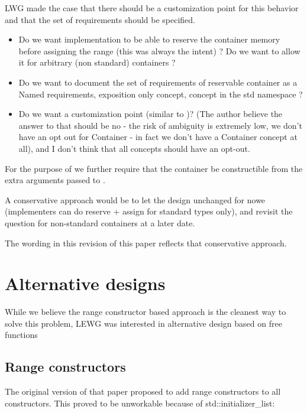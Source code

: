 \documentclass{wg21}
\begin{document}
LWG made the case that there should be a customization point for this behavior and that the set of requirements should be specified.

\begin{itemize}
\item Do we want implementation to be able to reserve the container memory before assigning the range (this was always the intent) ? Do we want to allow it for arbitrary (non standard) containers ?


\item Do we want to document the set of requirements of reservable container as a Named requirements, exposition only concept, concept in the std namespace ?
\item Do we want a customization point (similar to )? (The author believe the answer to that should be no - the risk of ambiguity is extremely low, we don't have an opt out for Container - in fact we don't have a Container concept at all), and I don't think that all concepts should have an opt-out.
\end{itemize}

For the purpose of  we further require that the container be constructible 
from the extra arguments passed to .


A conservative approach would be to let the design unchanged for nowe (implementers can do reserve + assign for standard types only), and revisit the question for non-standard containers at a later date.

The wording in this revision of this paper reflects that conservative approach.



\section{Alternative designs}

While we believe the range constructor based approach is the cleanest way to solve this problem,
LEWG was interested in alternative design based on free functions

\subsection{Range constructors}

The original version of that paper proposed to add range constructors to all constructors.
This proved to be unworkable because of std::initializer_list:
\end{document}
